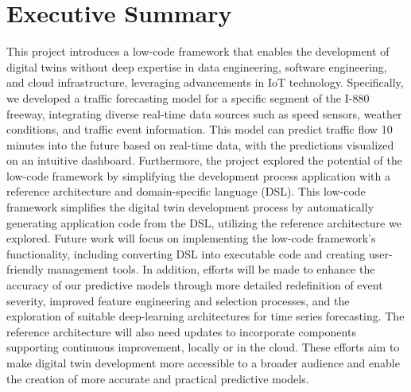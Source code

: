 \section*{Executive Summary}
This project introduces a low-code framework that enables the development of digital twins without deep expertise in data engineering, software engineering, and cloud infrastructure, leveraging advancements in IoT technology. Specifically, we developed a traffic forecasting model for a specific segment of the I-880 freeway, integrating diverse real-time data sources such as speed sensors, weather conditions, and traffic event information. This model can predict traffic flow 10 minutes into the future based on real-time data, with the predictions visualized on an intuitive dashboard. Furthermore, the project explored the potential of the low-code framework by simplifying the development process application with a reference architecture and domain-specific language (DSL). This low-code framework simplifies the digital twin development process by automatically generating application code from the DSL, utilizing the reference architecture we explored. Future work will focus on implementing the low-code framework's functionality, including converting DSL into executable code and creating user-friendly management tools. In addition, efforts will be made to enhance the accuracy of our predictive models through more detailed redefinition of event severity, improved feature engineering and selection processes, and the exploration of suitable deep-learning architectures for time series forecasting. The reference architecture will also need updates to incorporate components supporting continuous improvement, locally or in the cloud. These efforts aim to make digital twin development more accessible to a broader audience and enable the creation of more accurate and practical predictive models.